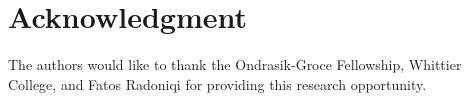 \documentclass[journal]{IEEEtran}
\begin{document}

%





\section*{Acknowledgment}


The authors would like to thank the Ondrasik-Groce Fellowship, Whittier College, and Fatos Radoniqi for providing this research opportunity.


\ifCLASSOPTIONcaptionsoff
  \newpage
\fi




\end{document}
